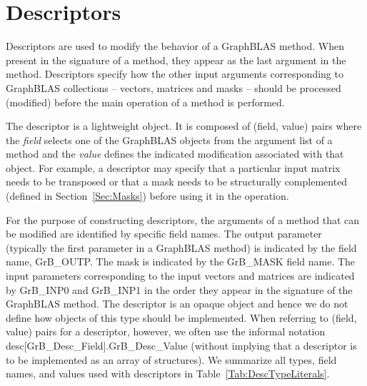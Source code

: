 \section{Descriptors}
\label{Sec:Descriptors}

Descriptors are used to modify the behavior of a GraphBLAS method.
When present in the signature of a method, they appear as the last argument in the method.
Descriptors specify how the other input arguments
corresponding to GraphBLAS collections -- vectors, matrices and masks -- should
be processed (modified) before the main operation of a method is performed.

The descriptor is a lightweight object.  It is composed
of (field, value) pairs where the \emph{field} selects one of the GraphBLAS objects
from the argument list of a method and the \emph{value} defines the indicated modification
associated with that object.  For example, a descriptor may specify that a particular 
input matrix needs to be transposed or that a mask needs to be structurally 
complemented (defined in Section~\ref{Sec:Masks}) before using it in the operation.

For the purpose of constructing descriptors, the arguments of a method
that can be modified are identified by specific field names. The output parameter (typically
the first parameter in a GraphBLAS method) is indicated by the field name, 
{\sf GrB\_OUTP}.  The mask is indicated by the {\sf GrB\_MASK} field name. The input parameters
corresponding to the input vectors and matrices are indicated by {\sf GrB\_INP0} and
{\sf GrB\_INP1} in the order they appear in the signature of the GraphBLAS method. 
The descriptor is an opaque object and hence we do not define how objects of this type should
be implemented.   When referring to (field, value) pairs for a descriptor, however, we often use the informal
notation {\sf desc[GrB\_Desc\_Field].GrB\_Desc\_Value} (without implying that a descriptor is to be implemented as an
array of structures).    We summarize all types, field names, and values used 
with descriptors in Table~\ref{Tab:DescTypeLiterals}. 



